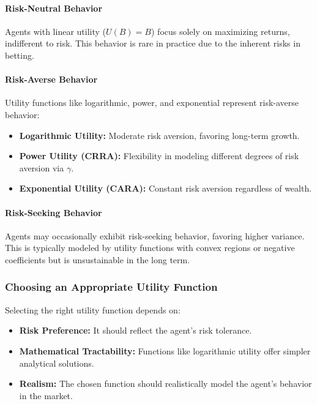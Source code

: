 \paragraph{Risk-Neutral Behavior}

Agents with linear utility (\( U(B) = B \)) focus solely on maximizing returns, indifferent to risk. This behavior is rare in practice due to the inherent risks in betting.

\paragraph{Risk-Averse Behavior}

Utility functions like logarithmic, power, and exponential represent risk-averse behavior:

\begin{itemize}
    \item \textbf{Logarithmic Utility:} Moderate risk aversion, favoring long-term growth.
    \item \textbf{Power Utility (CRRA):} Flexibility in modeling different degrees of risk aversion via \( \gamma \).
    \item \textbf{Exponential Utility (CARA):} Constant risk aversion regardless of wealth.
\end{itemize}

\paragraph{Risk-Seeking Behavior}

Agents may occasionally exhibit risk-seeking behavior, favoring higher variance. This is typically modeled by utility functions with convex regions or negative coefficients but is unsustainable in the long term.

\subsubsection{Choosing an Appropriate Utility Function}

Selecting the right utility function depends on:

\begin{itemize}
    \item \textbf{Risk Preference:} It should reflect the agent’s risk tolerance.
    \item \textbf{Mathematical Tractability:} Functions like logarithmic utility offer simpler analytical solutions.
    \item \textbf{Realism:} The chosen function should realistically model the agent’s behavior in the market.
\end{itemize}

